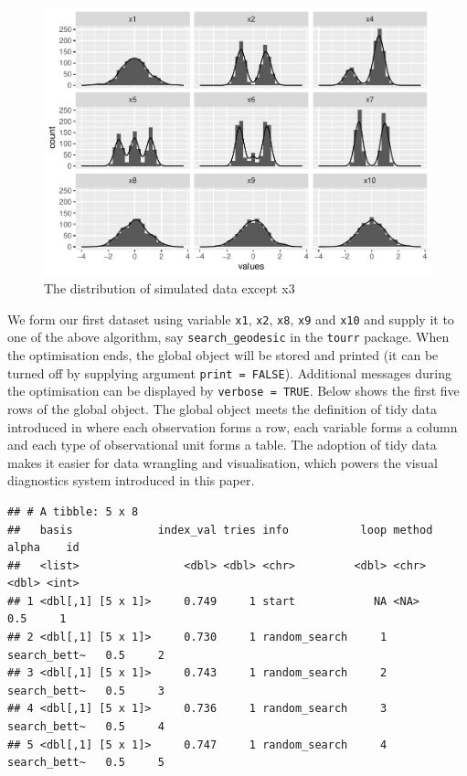 \documentclass[12pt]{article}
\begin{document}
\begin{figure}
\centering
\includegraphics{paper_files/figure-latex/origin-data-1.pdf}
\caption{\label{origin-data} The distribution of simulated data except
x3}
\end{figure}

We form our first dataset using variable \texttt{x1}, \texttt{x2},
\texttt{x8}, \texttt{x9} and \texttt{x10} and supply it to one of the
above algorithm, say \texttt{search\_geodesic} in the \texttt{tourr}
package. When the optimisation ends, the global object will be stored
and printed (it can be turned off by supplying argument
\texttt{print\ =\ FALSE}). Additional messages during the optimisation
can be displayed by \texttt{verbose\ =\ TRUE}. Below shows the first
five rows of the global object. The global object meets the definition
of tidy data introduced in \citep{wickham2014tidy} where each
observation forms a row, each variable forms a column and each type of
observational unit forms a table. The adoption of tidy data makes it
easier for data wrangling and visualisation, which powers the visual
diagnostics system introduced in this paper.

\newpage

\begin{verbatim}
## # A tibble: 5 x 8
##   basis             index_val tries info           loop method       alpha    id
##   <list>                <dbl> <dbl> <chr>         <dbl> <chr>        <dbl> <int>
## 1 <dbl[,1] [5 x 1]>     0.749     1 start            NA <NA>           0.5     1
## 2 <dbl[,1] [5 x 1]>     0.730     1 random_search     1 search_bett~   0.5     2
## 3 <dbl[,1] [5 x 1]>     0.743     1 random_search     2 search_bett~   0.5     3
## 4 <dbl[,1] [5 x 1]>     0.736     1 random_search     3 search_bett~   0.5     4
## 5 <dbl[,1] [5 x 1]>     0.747     1 random_search     4 search_bett~   0.5     5
\end{verbatim}
\end{document}
